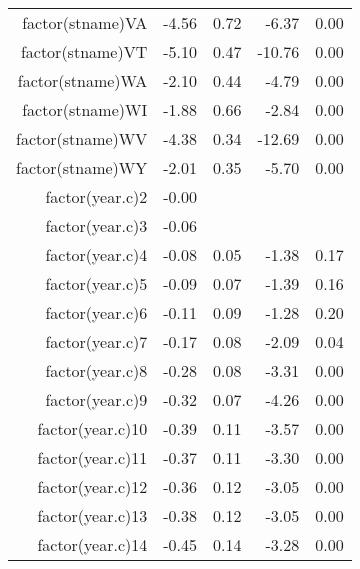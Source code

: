 \begin{table}[ht]
\begin{tabular}{rrrrr}
  factor(stname)VA & -4.56 & 0.72 & -6.37 & 0.00 \\ 
  factor(stname)VT & -5.10 & 0.47 & -10.76 & 0.00 \\ 
  factor(stname)WA & -2.10 & 0.44 & -4.79 & 0.00 \\ 
  factor(stname)WI & -1.88 & 0.66 & -2.84 & 0.00 \\ 
  factor(stname)WV & -4.38 & 0.34 & -12.69 & 0.00 \\ 
  factor(stname)WY & -2.01 & 0.35 & -5.70 & 0.00 \\ 
  factor(year.c)2 & -0.00 &  &  &  \\ 
  factor(year.c)3 & -0.06 &  &  &  \\ 
  factor(year.c)4 & -0.08 & 0.05 & -1.38 & 0.17 \\ 
  factor(year.c)5 & -0.09 & 0.07 & -1.39 & 0.16 \\ 
  factor(year.c)6 & -0.11 & 0.09 & -1.28 & 0.20 \\ 
  factor(year.c)7 & -0.17 & 0.08 & -2.09 & 0.04 \\ 
  factor(year.c)8 & -0.28 & 0.08 & -3.31 & 0.00 \\ 
  factor(year.c)9 & -0.32 & 0.07 & -4.26 & 0.00 \\ 
  factor(year.c)10 & -0.39 & 0.11 & -3.57 & 0.00 \\ 
  factor(year.c)11 & -0.37 & 0.11 & -3.30 & 0.00 \\ 
  factor(year.c)12 & -0.36 & 0.12 & -3.05 & 0.00 \\ 
  factor(year.c)13 & -0.38 & 0.12 & -3.05 & 0.00 \\ 
  factor(year.c)14 & -0.45 & 0.14 & -3.28 & 0.00 \\ 
   \hline
\end{tabular}
\end{table}
